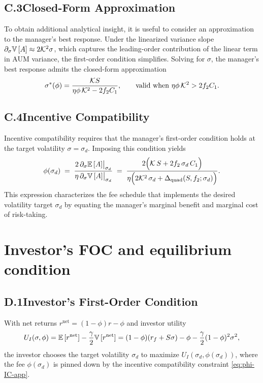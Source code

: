 \subsection*{C.3\quad Closed-Form Approximation}
To obtain additional analytical insight, it is useful to consider an approximation to the manager's best response. Under the linearized variance slope $\partial_\sigma {\mathbb{V}}\,[A]\approx 2\mathcal{K}^2\sigma$, which captures the leading-order contribution of the linear term in AUM variance, the first-order condition simplifies. Solving for $\sigma$, the manager's best response admits the closed-form approximation
\begin{equation}
\label{eq:sigma-star}
\sigma^*(\phi) = \frac{\mathcal{K} S}{\eta\phi\,\mathcal{K}^2 - 2f_2 C_1},\qquad \text{valid when } \eta\phi\,\mathcal{K}^2> 2f_2 C_1.
\end{equation}

\subsection*{C.4\quad Incentive Compatibility}
Incentive compatibility requires that the manager's first-order condition holds at the target volatility $\sigma=\sigma_d$. Imposing this condition yields
\begin{equation}
\label{eq:phi-IC-app}
\phi(\sigma_d)
\;=\;
\frac{2\,\partial_\sigma {\mathbb{E}}\,[A]\big|_{\sigma_d}}
{\eta\,\partial_\sigma {\mathbb{V}}\,[A]\big|_{\sigma_d}}
\;=\;
\frac{2\Big(\mathcal{K}\,S + 2 f_2 \,\sigma_d\,C_1\Big)}
{\eta\Big(2 \mathcal{K}^2 \,\sigma_d + \Delta_{\text{quad}}(S,f_2;\sigma_d)\Big)}.
\end{equation}
This expression characterizes the fee schedule that implements the desired volatility target $\sigma_d$ by equating the manager's marginal benefit and marginal cost of risk-taking.

\section{Investor's FOC and equilibrium condition}
\label{app:investor}

\subsection*{D.1\quad Investor's First-Order Condition}
With net returns $r^{\text{net}}=(1-\phi)r-\phi$ and investor utility
\[
U_I(\sigma,\phi)={\mathbb{E}}\,[r^{\text{net}}] - \frac{\gamma}{2}{\mathbb{V}}\,[r^{\text{net}}] = (1-\phi)(r_f+S\sigma)-\phi-\frac{\gamma}{2}(1-\phi)^2\sigma^2,
\]
the investor chooses the target volatility $\sigma_d$ to maximize $U_I(\sigma_d,\phi(\sigma_d))$, where the fee $\phi(\sigma_d)$ is pinned down by the incentive compatibility constraint \eqref{eq:phi-IC-app}.

